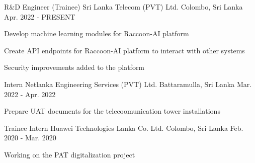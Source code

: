 

\begin{cventries}

  \cventry
  {R\&D Engineer (Trainee)} %
  {Sri Lanka Telecom (PVT) Ltd.} %
  {Colombo, Sri Lanka} %
  {Apr. 2022 - PRESENT} %
  {
    \begin{cvitems} %
      \item {Develop machine learning modules for Raccoon-AI platform}
      \item {Create API endpoints for Raccoon-AI platform to interact with other systems}
      \item {Security improvements added to the platform}
    \end{cvitems}
  }

  \cventry
  {Intern} %
  {Netlanka Engineering Services (PVT) Ltd.} %
  {Battaramulla, Sri Lanka} %
  {Mar. 2022 - Apr. 2022} %
  {
    \begin{cvitems} %
      \item {Prepare UAT documents for the telecoomunication tower installations}
    \end{cvitems}
  }

  \cventry
  {Trainee Intern} %
  {Huawei Technologies Lanka Co. Ltd.} %
  {Colombo, Sri Lanka} %
  {Feb. 2020 - Mar. 2020} %
  {
    \begin{cvitems} %
      \item {Working on the PAT digitalization project}
    \end{cvitems}
  }

\end{cventries}
